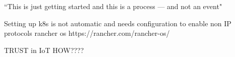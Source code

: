 “This is just getting started and this is a process — and not an event"

Setting up k8s is not automatic and needs configuration to enable non IP protocols
rancher os
https://rancher.com/rancher-os/

TRUST in IoT HOW????